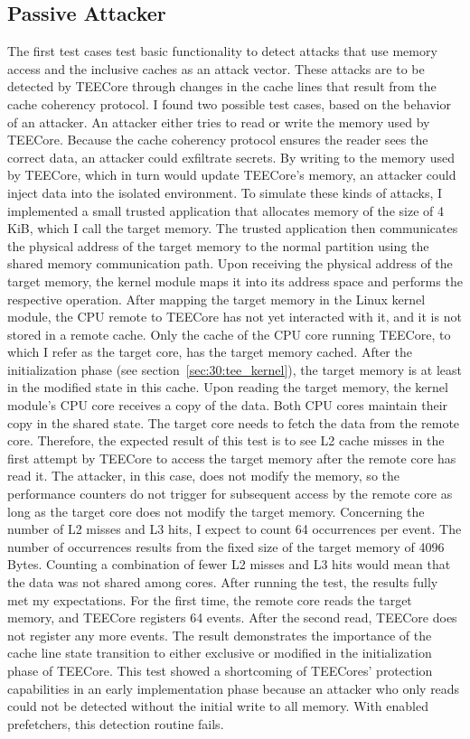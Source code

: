 \subsection{Passive Attacker}
\label{sec:evaluation:passive}
The first test cases test basic functionality to detect attacks that use memory
access and the inclusive caches as an attack vector. These attacks are to be
detected by TEECore through changes in the cache lines that result from the
cache coherency protocol. I found two possible test cases, based on the behavior
of an attacker. An attacker either tries to read or write the memory used by
TEECore. Because the cache coherency protocol ensures the reader sees the
correct data, an attacker could exfiltrate secrets. By writing to the memory
used by TEECore, which in turn would update TEECore's memory, an attacker could
inject data into the isolated environment. To simulate these kinds of attacks, I
implemented a small trusted application that allocates memory of the size of 4
KiB, which I call the target memory. The trusted application then communicates
the physical address of the target memory to the normal partition using the
shared memory communication path. Upon receiving the physical address of the
target memory, the kernel module maps it into its address space and performs the
respective operation. After mapping the target memory in the Linux kernel
module, the CPU remote to TEECore has not yet interacted with it, and it is not
stored in a remote cache. Only the cache of the CPU core running TEECore, to
which I refer as the target core, has the target memory cached. After the
initialization phase (see section~\ref{sec:30:tee_kernel}), the target memory is
at least in the modified state in this cache. Upon reading the target memory,
the kernel module's CPU core receives a copy of the data. Both CPU cores
maintain their copy in the shared state. The target core needs to fetch the data
from the remote core. Therefore, the expected result of this test is to see L2
cache misses in the first attempt by TEECore to access the target memory after
the remote core has read it. The attacker, in this case, does not modify the
memory, so the performance counters do not trigger for subsequent access by the
remote core as long as the target core does not modify the target memory.
Concerning the number of L2 misses and L3 hits, I expect to count 64 occurrences
per event. The number of occurrences results from the fixed size of the target
memory of 4096 Bytes. Counting a combination of fewer L2 misses and L3 hits
would mean that the data was not shared among cores. After running the test, the
results fully met my expectations. For the first time, the remote core reads the
target memory, and TEECore registers 64 events. After the second read, TEECore
does not register any more events. The result demonstrates the importance of the
cache line state transition to either exclusive or modified in the
initialization phase of TEECore. This test showed a shortcoming of TEECores'
protection capabilities in an early implementation phase because an attacker who
only reads could not be detected without the initial write to all memory. With
enabled prefetchers, this detection routine fails.\\

